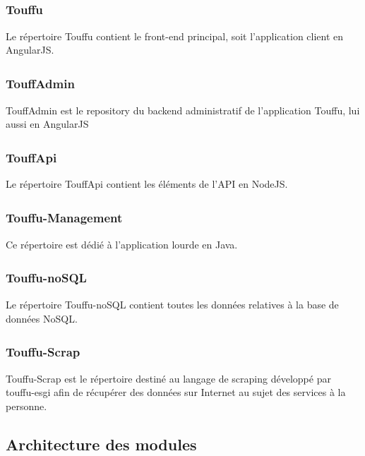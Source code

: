 \documentclass[conference]{IEEEtran}
\newcommand{\bibRef}[1]
{\textsuperscript{\cite{#1}}}
\begin{document}
\subsubsection*{Touffu\bibRef{Touffu} }

Le répertoire Touffu contient le front-end principal, soit l'application client en AngularJS.\\

\subsubsection*{TouffAdmin\bibRef{TouffAdmin} }

TouffAdmin est le repository du backend administratif de l'application Touffu, lui aussi en AngularJS\\

\subsubsection*{TouffApi\bibRef{TouffApi} }

Le répertoire TouffApi contient les éléments de l'API en NodeJS.\\

\subsubsection*{Touffu-Management\bibRef{Touffu-Management} }

Ce répertoire est dédié à l'application lourde en Java.\\

\subsubsection*{Touffu-noSQL\bibRef{Touffu-noSQL} }

Le répertoire Touffu-noSQL contient toutes les données relatives à la base de données NoSQL.\\

\subsubsection*{Touffu-Scrap\bibRef{Touffu-Scrap} }

Touffu-Scrap est le répertoire destiné au langage de scraping développé par touffu-esgi afin de récupérer des données sur Internet au sujet des services à la personne.\\

\subsection{Architecture des modules}
\end{document}
